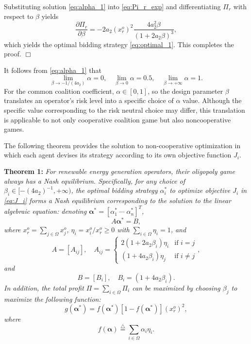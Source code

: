\documentclass[journal]{IEEEtran}
\begin{document}
Substituting solution \eqref{eq:alpha_1} into 
\eqref{eq:Pi_r_exp} and differentiating $\Pi_r$ with respect to $\beta$ yields
\[ \frac{\partial \Pi_r}{\partial \beta} = - 2a_2(x_r^o)^2\frac{4a_2^2\beta}{(1+2a_2\beta)^3}, \]
which yields the optimal bidding strategy \eqref{eq:optimal_1}. This completes the proof. \hfill $\Box$

It follows from \eqref{eq:alpha_1} that
\[ \lim_{\beta\rightarrow-1/(4a_2)} \alpha = 0, \quad  \lim_{\beta\rightarrow0} \alpha = 0.5, \quad \lim_{\beta\rightarrow +\infty} \alpha = 1. \]
For the common coalition coefficient, $\alpha\in[0,1]$, so the design parameter $\beta$ translates an operator's risk level into a specific choice of $\alpha$ value. Although the specific value corresponding to the risk neutral choice may differ, this translation is applicable to not only cooperative coalition game but also noncooperative games. 

The following theorem provides the solution to non-cooperative optimization in which each agent devises its strategy according to its own objective function $J_i$. 

\noindent \textbf{Theorem 1:} {\it For renewable energy generation operators, their oligopoly game always has a Nash equilibrium. Specifically,
for any choice of $\beta_i\in[-(4a_2)^{-1},+\infty)$, the optimal bidding strategy $\alpha_i^*$ to optimize objective $J_i$ in \eqref{eq:J_i} forms a Nash equilibrium corresponding to the solution to the linear algebraic equation:
denoting $\boldsymbol{\alpha}^*=[\alpha_1^* \; \cdots \; \alpha_n^*]^T$,
\begin{equation}
A \boldsymbol{\alpha}^* = B,
\label{eq:alpha_i}
\end{equation}
where $x_r^o = \sum_{j\in\Omega} x_j^o$, $\eta_i = x_i^o/x_r^o\geq0$ with $\sum_{i\in\Omega} \eta_i=1$, and
\[ A=[A_{ij}], \quad A_{ij} = \left\{ \begin{array}{ll} 2(1+2a_2\beta_i)\eta_i & \mbox{if $i=j$} \\
(1+4a_2\beta_i)\eta_j & \mbox{if $i\not=j$}\end{array} \right., \]
and
\[ B=[B_i], \quad B_i = (1+4a_2\beta_i). \]
In addition,  the total profit $\Pi=\sum_{i\in\Omega}\Pi_i$ can be maximized by choosing $\beta_j$ to maximize the following function: 
\begin{equation} 
g(\boldsymbol{\alpha}^*) = f(\boldsymbol{\alpha}^*) \left[ 1 - f(\boldsymbol{\alpha}^*)  \right](x_r^o)^2,
\label{eq:G}
\end{equation} 
where  
\begin{equation} 
f(\boldsymbol{\alpha}) \stackrel{\triangle}{=} \sum_{i\in\Omega}  \alpha_i \eta_i.  
\label{eq:F}
\end{equation} 
}
\end{document}
